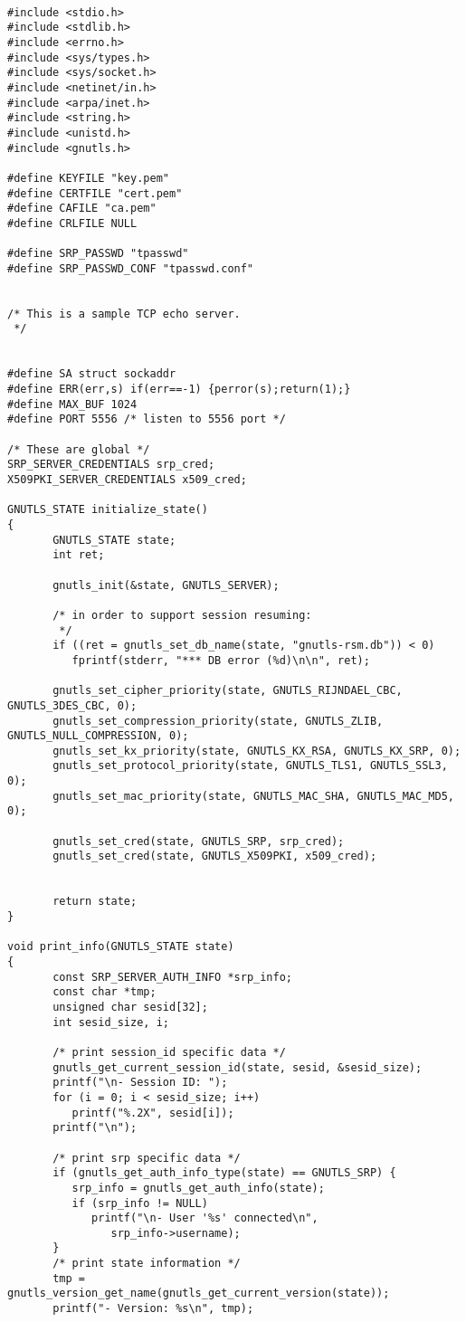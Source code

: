 \begin{verbatim}

#include <stdio.h>
#include <stdlib.h>
#include <errno.h>
#include <sys/types.h>
#include <sys/socket.h>
#include <netinet/in.h>
#include <arpa/inet.h>
#include <string.h>
#include <unistd.h>
#include <gnutls.h>

#define KEYFILE "key.pem"
#define CERTFILE "cert.pem"
#define CAFILE "ca.pem"
#define CRLFILE NULL

#define SRP_PASSWD "tpasswd"
#define SRP_PASSWD_CONF "tpasswd.conf"


/* This is a sample TCP echo server.
 */


#define SA struct sockaddr
#define ERR(err,s) if(err==-1) {perror(s);return(1);}
#define MAX_BUF 1024
#define PORT 5556 /* listen to 5556 port */

/* These are global */
SRP_SERVER_CREDENTIALS srp_cred;
X509PKI_SERVER_CREDENTIALS x509_cred;

GNUTLS_STATE initialize_state()
{
       GNUTLS_STATE state;
       int ret;

       gnutls_init(&state, GNUTLS_SERVER);
	
       /* in order to support session resuming:
        */
       if ((ret = gnutls_set_db_name(state, "gnutls-rsm.db")) < 0)
	      fprintf(stderr, "*** DB error (%d)\n\n", ret);

       gnutls_set_cipher_priority(state, GNUTLS_RIJNDAEL_CBC, GNUTLS_3DES_CBC, 0);
       gnutls_set_compression_priority(state, GNUTLS_ZLIB, GNUTLS_NULL_COMPRESSION, 0);
       gnutls_set_kx_priority(state, GNUTLS_KX_RSA, GNUTLS_KX_SRP, 0);
       gnutls_set_protocol_priority(state, GNUTLS_TLS1, GNUTLS_SSL3, 0);
       gnutls_set_mac_priority(state, GNUTLS_MAC_SHA, GNUTLS_MAC_MD5, 0);

       gnutls_set_cred(state, GNUTLS_SRP, srp_cred);
       gnutls_set_cred(state, GNUTLS_X509PKI, x509_cred);


       return state;
}

void print_info(GNUTLS_STATE state)
{
       const SRP_SERVER_AUTH_INFO *srp_info;
       const char *tmp;
       unsigned char sesid[32];
       int sesid_size, i;

       /* print session_id specific data */
       gnutls_get_current_session_id(state, sesid, &sesid_size);
       printf("\n- Session ID: ");
       for (i = 0; i < sesid_size; i++)
	      printf("%.2X", sesid[i]);
       printf("\n");

       /* print srp specific data */
       if (gnutls_get_auth_info_type(state) == GNUTLS_SRP) {
	      srp_info = gnutls_get_auth_info(state);
	      if (srp_info != NULL)
		     printf("\n- User '%s' connected\n",
			    srp_info->username);
       }
       /* print state information */
       tmp = gnutls_version_get_name(gnutls_get_current_version(state));
       printf("- Version: %s\n", tmp);


\end{verbatim}
